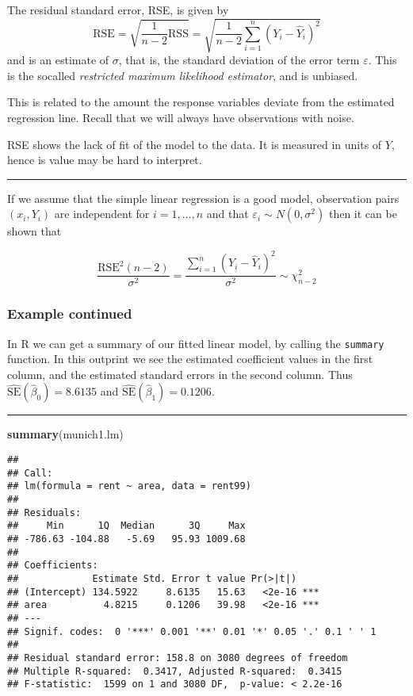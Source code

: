 \documentclass[]{article}
\newenvironment{Shaded}{\begin{snugshade}}{\end{snugshade}}
\newcommand{\KeywordTok}[1]{\textcolor[rgb]{0.13,0.29,0.53}{\textbf{#1}}}
\newcommand{\NormalTok}[1]{#1}
\begin{document}
The residual standard error, RSE, is given by
\[\text{RSE}  =\sqrt{\frac{1}{n-2} \text{RSS}} = \sqrt{\frac{1}{n-2}\sum_{i=1}^n (Y_i -\hat{Y}_i)^2}\]
and is an estimate of \(\sigma\), that is, the standard deviation of the
error term \(\varepsilon\). This is the socalled \emph{restricted
maximum likelihood estimator}, and is unbiased.

This is related to the amount the response variables deviate from the
estimated regression line. Recall that we will always have observations
with noise.

RSE shows the lack of fit of the model to the data. It is measured in
units of \(Y\), hence is value may be hard to interpret.

\begin{center}\rule{0.5\linewidth}{\linethickness}\end{center}

If we assume that the simple linear regression is a good model,
observation pairs \((x_i,Y_i)\) are independent for \(i=1,\ldots,n\) and
that \(\varepsilon_i\sim N(0,\sigma^2)\) then it can be shown that

\[\frac{\text{RSE}^2(n-2)}{\sigma^2}= \frac{\sum_{i=1}^n (Y_i -\hat{Y}_i)^2}{\sigma^2}\sim \chi^2_{n-2}\]

\hypertarget{example-continued-1}{%
\subsubsection{Example continued}\label{example-continued-1}}

In R we can get a summary of our fitted linear model, by calling the
\texttt{summary} function. In this outprint we see the estimated
coefficient values in the first column, and the estimated standard
errors in the second column. Thus
\(\hat{\text{SE}}(\hat{\beta}_0) = 8.6135\) and
\(\hat{\text{SE}}(\hat{\beta}_1) = 0.1206\).

\begin{center}\rule{0.5\linewidth}{\linethickness}\end{center}

\small

\begin{Shaded}
\begin{Highlighting}[]
\KeywordTok{summary}\NormalTok{(munich1.lm)}
\end{Highlighting}
\end{Shaded}

\begin{verbatim}
## 
## Call:
## lm(formula = rent ~ area, data = rent99)
## 
## Residuals:
##     Min      1Q  Median      3Q     Max 
## -786.63 -104.88   -5.69   95.93 1009.68 
## 
## Coefficients:
##             Estimate Std. Error t value Pr(>|t|)    
## (Intercept) 134.5922     8.6135   15.63   <2e-16 ***
## area          4.8215     0.1206   39.98   <2e-16 ***
## ---
## Signif. codes:  0 '***' 0.001 '**' 0.01 '*' 0.05 '.' 0.1 ' ' 1
## 
## Residual standard error: 158.8 on 3080 degrees of freedom
## Multiple R-squared:  0.3417, Adjusted R-squared:  0.3415 
## F-statistic:  1599 on 1 and 3080 DF,  p-value: < 2.2e-16
\end{verbatim}
\end{document}
